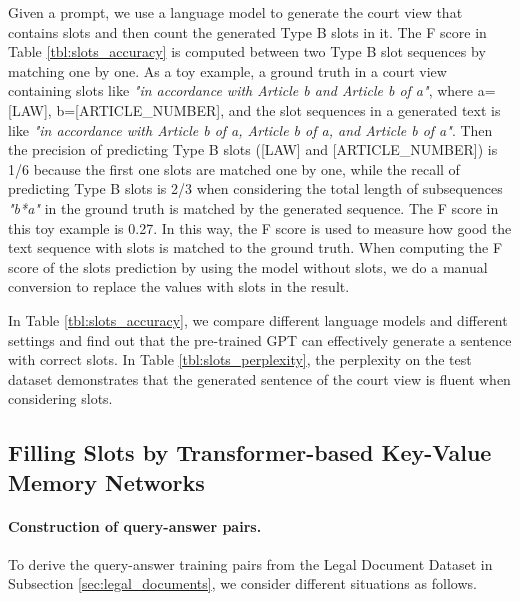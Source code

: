 \documentclass{article}
\begin{document}
Given a prompt, we use a language model to generate the court view that contains slots and then count the generated Type B slots in it. 
The F score in Table \ref{tbl:slots_accuracy} is computed between two Type B slot sequences by matching one by one. 
As a toy example, a ground truth in a court view containing slots like \textit{"in accordance with Article b and Article b of a"}, where a=[LAW], b=[ARTICLE\_NUMBER], and the slot sequences in a generated text is like \textit{"in accordance with Article b of a, Article b of a, and Article b of a"}. 
Then the precision of predicting Type B slots ([LAW] and [ARTICLE\_NUMBER]) is 1/6 because the first one slots are matched one by one, while the recall of predicting Type B slots is 2/3 when considering the total length of subsequences \textit{"b*a"} in the ground truth is matched by the generated sequence. 
The F score in this toy example is 0.27. 
In this way, the F score is used to measure how good the text sequence with slots is matched to the ground truth.
When computing the F score of the slots prediction by using the model without slots, we do a manual conversion to replace the values with slots in the result.

In Table \ref{tbl:slots_accuracy}, we compare different language models and different settings and find out that the pre-trained GPT can effectively generate a sentence with correct slots.
In Table \ref{tbl:slots_perplexity}, the perplexity on the test dataset demonstrates that the generated sentence of the court view is fluent when considering slots. 


\subsection{Filling Slots by Transformer-based Key-Value Memory Networks}
\paragraph{Construction of query-answer pairs.} 
To derive the query-answer training pairs from the Legal Document Dataset in Subsection \ref{sec:legal_documents}, we consider different situations as follows.
 
\end{document}
